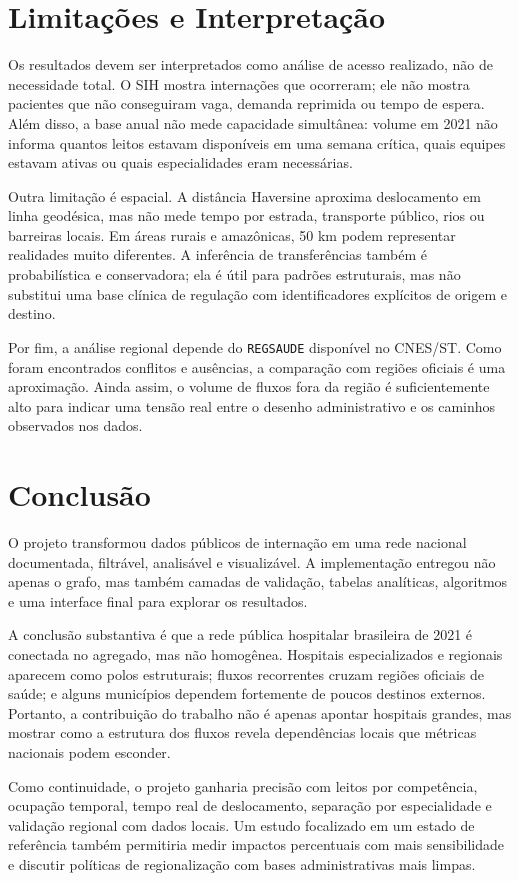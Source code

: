 \documentclass[10pt,a4paper]{article}
\begin{document}
\section{Limitações e Interpretação}

Os resultados devem ser interpretados como análise de acesso realizado, não de necessidade total. O SIH mostra internações que ocorreram; ele não mostra pacientes que não conseguiram vaga, demanda reprimida ou tempo de espera. Além disso, a base anual não mede capacidade simultânea: volume em 2021 não informa quantos leitos estavam disponíveis em uma semana crítica, quais equipes estavam ativas ou quais especialidades eram necessárias.

Outra limitação é espacial. A distância Haversine aproxima deslocamento em linha geodésica, mas não mede tempo por estrada, transporte público, rios ou barreiras locais. Em áreas rurais e amazônicas, 50 km podem representar realidades muito diferentes. A inferência de transferências também é probabilística e conservadora; ela é útil para padrões estruturais, mas não substitui uma base clínica de regulação com identificadores explícitos de origem e destino.

Por fim, a análise regional depende do \texttt{REGSAUDE} disponível no CNES/ST. Como foram encontrados conflitos e ausências, a comparação com regiões oficiais é uma aproximação. Ainda assim, o volume de fluxos fora da região é suficientemente alto para indicar uma tensão real entre o desenho administrativo e os caminhos observados nos dados.

\section{Conclusão}

O projeto transformou dados públicos de internação em uma rede nacional documentada, filtrável, analisável e visualizável. A implementação entregou não apenas o grafo, mas também camadas de validação, tabelas analíticas, algoritmos e uma interface final para explorar os resultados.

A conclusão substantiva é que a rede pública hospitalar brasileira de 2021 é conectada no agregado, mas não homogênea. Hospitais especializados e regionais aparecem como polos estruturais; fluxos recorrentes cruzam regiões oficiais de saúde; e alguns municípios dependem fortemente de poucos destinos externos. Portanto, a contribuição do trabalho não é apenas apontar hospitais grandes, mas mostrar como a estrutura dos fluxos revela dependências locais que métricas nacionais podem esconder.

Como continuidade, o projeto ganharia precisão com leitos por competência, ocupação temporal, tempo real de deslocamento, separação por especialidade e validação regional com dados locais. Um estudo focalizado em um estado de referência também permitiria medir impactos percentuais com mais sensibilidade e discutir políticas de regionalização com bases administrativas mais limpas.



\end{document}
